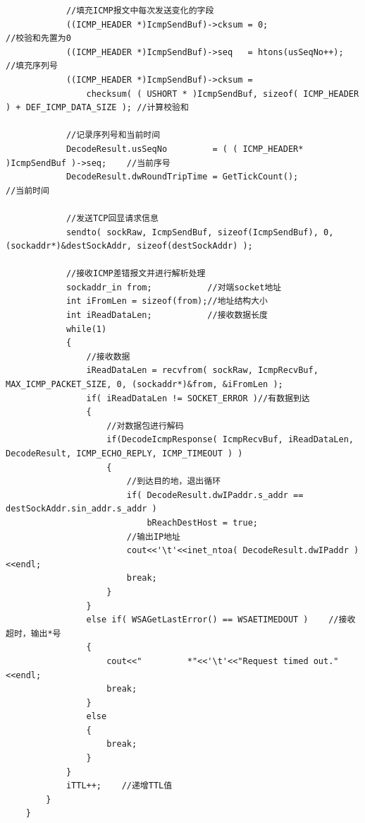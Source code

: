\documentclass[a4paper,UTF8]{article}
\begin{document}
\begin{lstlisting}
            //填充ICMP报文中每次发送变化的字段
            ((ICMP_HEADER *)IcmpSendBuf)->cksum = 0;                   //校验和先置为0
            ((ICMP_HEADER *)IcmpSendBuf)->seq   = htons(usSeqNo++);    //填充序列号
            ((ICMP_HEADER *)IcmpSendBuf)->cksum = 
                checksum( ( USHORT * )IcmpSendBuf, sizeof( ICMP_HEADER ) + DEF_ICMP_DATA_SIZE ); //计算校验和

            //记录序列号和当前时间
            DecodeResult.usSeqNo         = ( ( ICMP_HEADER* )IcmpSendBuf )->seq;    //当前序号
            DecodeResult.dwRoundTripTime = GetTickCount();                          //当前时间

            //发送TCP回显请求信息
            sendto( sockRaw, IcmpSendBuf, sizeof(IcmpSendBuf), 0, (sockaddr*)&destSockAddr, sizeof(destSockAddr) );

            //接收ICMP差错报文并进行解析处理
            sockaddr_in from;           //对端socket地址
            int iFromLen = sizeof(from);//地址结构大小
            int iReadDataLen;           //接收数据长度
            while(1)
            {
                //接收数据
                iReadDataLen = recvfrom( sockRaw, IcmpRecvBuf, MAX_ICMP_PACKET_SIZE, 0, (sockaddr*)&from, &iFromLen );
                if( iReadDataLen != SOCKET_ERROR )//有数据到达
                {
                    //对数据包进行解码
                    if(DecodeIcmpResponse( IcmpRecvBuf, iReadDataLen, DecodeResult, ICMP_ECHO_REPLY, ICMP_TIMEOUT ) )
                    {
                        //到达目的地，退出循环
                        if( DecodeResult.dwIPaddr.s_addr == destSockAddr.sin_addr.s_addr )
                            bReachDestHost = true;
                        //输出IP地址
                        cout<<'\t'<<inet_ntoa( DecodeResult.dwIPaddr )<<endl;
                        break;
                    }
                }
                else if( WSAGetLastError() == WSAETIMEDOUT )    //接收超时，输出*号
                {
                    cout<<"         *"<<'\t'<<"Request timed out."<<endl;
                    break;
                }
                else
                {
                    break;
                }
            }
            iTTL++;    //递增TTL值
        }
    }
\end{lstlisting}
\end{document}
